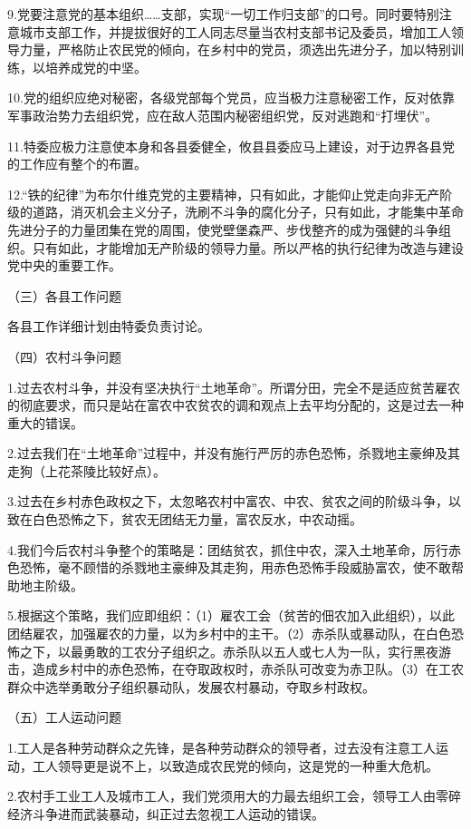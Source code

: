 9.党要注意党的基本组织……支部，实现“一切工作归支部”的口号。同时要特别注意城市支部工作，并提拔很好的工人同志尽量当农村支部书记及委员，增加工人领导力量，严格防止农民党的倾向，在乡村中的党员，须选出先进分子，加以特别训练，以培养成党的中坚。

10.党的组织应绝对秘密，各级党部每个党员，应当极力注意秘密工作，反对依靠军事政治势力去组织党，应在敌人范围内秘密组织党，反对逃跑和“打埋伏”。

11.特委应极力注意使本身和各县委健全，攸县县委应马上建设，对于边界各县党的工作应有整个的布置。

12.“铁的纪律”为布尔什维克党的主要精神，只有如此，才能仰止党走向非无产阶级的道路，消灭机会主义分子，洗刷不斗争的腐化分子，只有如此，才能集中革命先进分子的力量团集在党的周围，使党壁堡森严、步伐整齐的成为强健的斗争组织。只有如此，才能增加无产阶级的领导力量。所以严格的执行纪律为改造与建设党中央的重要工作。

（三）各县工作问题

各县工作详细计划由特委负责讨论。

（四）农村斗争问题

1.过去农村斗争，并没有坚决执行“土地革命”。所谓分田，完全不是适应贫苦雇农的彻底要求，而只是站在富农中农贫农的调和观点上去平均分配的，这是过去一种重大的错误。

2.过去我们在“土地革命”过程中，并没有施行严厉的赤色恐怖，杀戮地主豪绅及其走狗（上花茶陵比较好点）。

3.过去在乡村赤色政权之下，太忽略农村中富农、中农、贫农之间的阶级斗争，以致在白色恐怖之下，贫农无团结无力量，富农反水，中农动摇。

4.我们今后农村斗争整个的策略是：团结贫农，抓住中农，深入土地革命，厉行赤色恐怖，毫不顾惜的杀戮地主豪绅及其走狗，用赤色恐怖手段威胁富农，使不敢帮助地主阶级。

5.根据这个策略，我们应即组织：（1）雇农工会（贫苦的佃农加入此组织），以此团结雇农，加强雇农的力量，以为乡村中的主干。（2）赤杀队或暴动队，在白色恐怖之下，以最勇敢的工农分子组织之。赤杀队以五人或七人为一队，实行黑夜游击，造成乡村中的赤色恐怖，在夺取政权时，赤杀队可改变为赤卫队。（3）在工农群众中选举勇敢分子组织暴动队，发展农村暴动，夺取乡村政权。

（五）工人运动问题

1.工人是各种劳动群众之先锋，是各种劳动群众的领导者，过去没有注意工人运动，工人领导更是说不上，以致造成农民党的倾向，这是党的一种重大危机。

2.农村手工业工人及城市工人，我们党须用大的力最去组织工会，领导工人由零碎经济斗争进而武装暴动，纠正过去忽视工人运动的错误。

